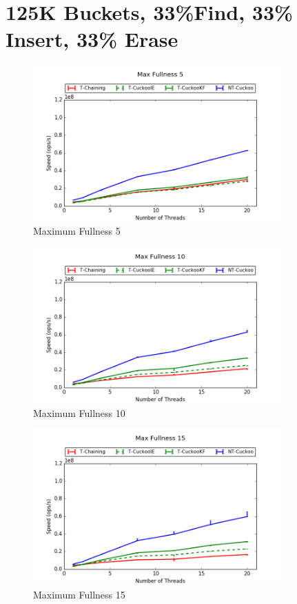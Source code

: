 \section{125K Buckets, 33\%Find, 33\% Insert, 33\% Erase}
\begin{figure}[H]
    \centering
	\includegraphics[width=0.85\textwidth]{maps/5HM125K:F34,I33,E33.png} 
        \caption*{Maximum Fullness 5}
\end{figure}
\begin{figure}[H]
    \centering
	\includegraphics[width=0.85\textwidth]{maps/10HM125K:F34,I33,E33.png} 
        \caption*{Maximum Fullness 10}
\end{figure}
\begin{figure}[H]
    \centering
	\includegraphics[width=0.85\textwidth]{maps/15HM125K:F34,I33,E33.png} 
        \caption*{Maximum Fullness 15}
\end{figure}



